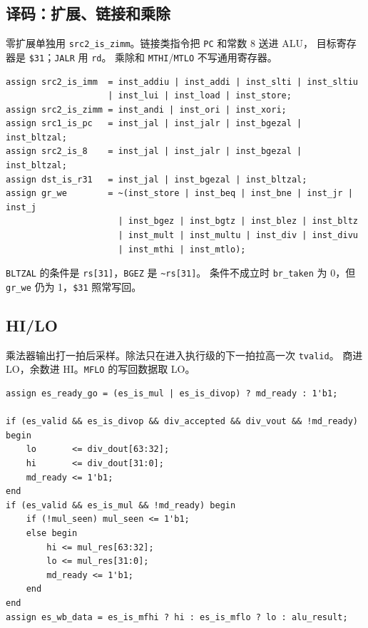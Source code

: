 \documentclass{article}
\begin{document}
\subsection{译码：扩展、链接和乘除}
零扩展单独用 \texttt{src2\_is\_zimm}。链接类指令把 \texttt{PC} 和常数 8 送进 ALU，
目标寄存器是 \texttt{\$31}；\texttt{JALR} 用 \texttt{rd}。
乘除和 \texttt{MTHI}/\texttt{MTLO} 不写通用寄存器。
\begin{verbatim}
assign src2_is_imm  = inst_addiu | inst_addi | inst_slti | inst_sltiu
                    | inst_lui | inst_load | inst_store;
assign src2_is_zimm = inst_andi | inst_ori | inst_xori;
assign src1_is_pc   = inst_jal | inst_jalr | inst_bgezal | inst_bltzal;
assign src2_is_8    = inst_jal | inst_jalr | inst_bgezal | inst_bltzal;
assign dst_is_r31   = inst_jal | inst_bgezal | inst_bltzal;
assign gr_we        = ~(inst_store | inst_beq | inst_bne | inst_jr | inst_j
                      | inst_bgez | inst_bgtz | inst_blez | inst_bltz
                      | inst_mult | inst_multu | inst_div | inst_divu
                      | inst_mthi | inst_mtlo);
\end{verbatim}
\texttt{BLTZAL} 的条件是 \texttt{rs[31]}，\texttt{BGEZ} 是 \texttt{\textasciitilde rs[31]}。
条件不成立时 \texttt{br\_taken} 为 0，但 \texttt{gr\_we} 仍为 1，\texttt{\$31} 照常写回。

\subsection{HI/LO}
乘法器输出打一拍后采样。除法只在进入执行级的下一拍拉高一次 \texttt{tvalid}。
商进 LO，余数进 HI。\texttt{MFLO} 的写回数据取 LO。
\begin{verbatim}
assign es_ready_go = (es_is_mul | es_is_divop) ? md_ready : 1'b1;

if (es_valid && es_is_divop && div_accepted && div_vout && !md_ready) begin
    lo       <= div_dout[63:32];
    hi       <= div_dout[31:0];
    md_ready <= 1'b1;
end
if (es_valid && es_is_mul && !md_ready) begin
    if (!mul_seen) mul_seen <= 1'b1;
    else begin
        hi <= mul_res[63:32];
        lo <= mul_res[31:0];
        md_ready <= 1'b1;
    end
end
assign es_wb_data = es_is_mfhi ? hi : es_is_mflo ? lo : alu_result;
\end{verbatim}
\end{document}
